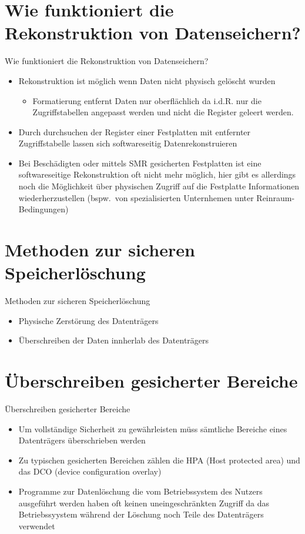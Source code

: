 \documentclass{beamer}
\begin{document}
\section{Wie funktioniert die Rekonstruktion von Datenseichern?}
\begin{frame}{Wie funktioniert die Rekonstruktion von Datenseichern?}
	\begin{itemize}
		\item Rekonstruktion ist möglich wenn Daten nicht physisch gelöscht
			wurden
			\begin{itemize}
				\item Formatierung entfernt Daten nur oberflächlich da i.d.R.
					nur die Zugriffstabellen angepasst werden und nicht die
					Register geleert werden.
			\end{itemize}
		\item Durch durchsuchen der Register einer Festplatten mit entfernter
			Zugriffstabelle lassen sich softwareseitig Datenrekonstruieren
		\item Bei Beschädigten oder mittels SMR gesicherten Festplatten ist
			eine softwareseitige Rekonstruktion oft nicht mehr möglich, hier
			gibt es allerdings noch die Möglichkeit über physischen Zugriff auf
			die Festplatte Informationen wiederherzustellen (bspw.\ von
			spezialisierten Unternhemen unter Reinraum-Bedingungen)
	\end{itemize}
\end{frame}

\section{Methoden zur sicheren Speicherlöschung}
\begin{frame}{Methoden zur sicheren Speicherlöschung}
	\begin{itemize}
		\item Physische Zerstörung des Datenträgers
		\item Überschreiben der Daten innherlab des Datenträgers
	\end{itemize}
\end{frame}

\section{Überschreiben gesicherter Bereiche}
\begin{frame}{Überschreiben gesicherter Bereiche}
	\begin{itemize}
		\item Um vollständige Sicherheit zu gewährleisten müss sämtliche
			Bereiche eines Datenträgers überschrieben werden
		\item Zu typischen gesicherten Bereichen zählen die HPA (Host protected
			area) und das DCO (device configuration overlay)
		\item Programme zur Datenlöschung die vom Betriebssystem des Nutzers
			ausgeführt werden haben oft keinen uneingeschränkten Zugriff da das
			Betriebssyystem während der Löschung noch Teile des Datenträgers
			verwendet
	\end{itemize}
\end{frame}
\end{document}

